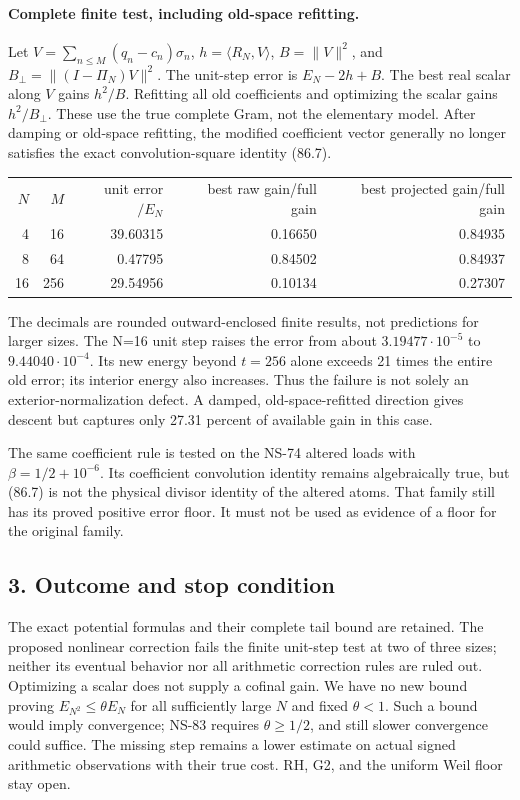 \paragraph{Complete finite test, including old-space refitting.}
Let $V=\sum_{n\leq M}(q_n-c_n)\sigma_n$, $h=\langle R_N,V\rangle$,
$B=\|V\|^2$, and $B_\perp=\|(I-\Pi_N)V\|^2$. The unit-step error is
$E_N-2h+B$. The best real scalar along $V$ gains $h^2/B$.
Refitting all old coefficients and optimizing the scalar gains
$h^2/B_\perp$. These use the true complete Gram, not the elementary model.
After damping or old-space refitting, the modified coefficient vector
generally no longer satisfies the exact convolution-square identity (86.7).

\begin{center}
\begin{tabular}{rrrrr}
$N$&$M$&unit error$/E_N$&best raw gain/full gain&best projected gain/full gain\\
4&16&39.60315&0.16650&0.84935\\
8&64&0.47795&0.84502&0.84937\\
16&256&29.54956&0.10134&0.27307
\end{tabular}
\end{center}
The decimals are rounded outward-enclosed finite results, not predictions
for larger sizes. The N=16 unit step raises the error from about
$3.19477\cdot10^{-5}$ to $9.44040\cdot10^{-4}$. Its new energy beyond
$t=256$ alone exceeds 21 times the entire old error; its interior energy
also increases. Thus the failure is not solely an exterior-normalization
defect. A damped, old-space-refitted direction gives descent but captures
only 27.31 percent of available gain in this case.

The same coefficient rule is tested on the NS-74 altered loads with
$\beta=1/2+10^{-6}$. Its coefficient convolution identity remains algebraically
true, but (86.7) is not the physical divisor identity of the altered atoms.
That family still has its proved positive error floor. It must not be used
as evidence of a floor for the original family.

\subsection*{3. Outcome and stop condition}
The exact potential formulas and their complete tail bound are retained.
The proposed nonlinear correction fails the finite unit-step test at two
of three sizes; neither its eventual behavior nor all arithmetic correction
rules are ruled out. Optimizing a scalar does not supply a cofinal gain.
We have no new bound proving $E_{N^2}\leq\theta E_N$ for all sufficiently
large $N$ and fixed $\theta<1$. Such a bound would imply convergence;
NS-83 requires $\theta\geq1/2$, and still slower convergence could suffice.
The missing step remains a lower estimate on actual signed arithmetic
observations with their true cost. RH, G2, and the uniform Weil floor stay open.
